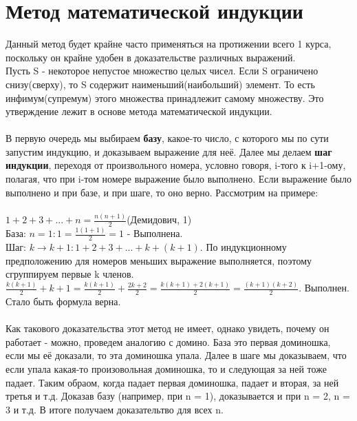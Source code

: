 \documentclass[a4paper]{article}
\begin{document}
\section{Метод математической индукции}
Данный метод будет крайне часто применяться на протижении всего 1 курса, поскольку он крайне удобен в доказательстве различных выражений.\\
Пусть S - некоторое непустое множество целых чисел. Если S ограничено снизу(сверху), то S содержит наименьший(наибольший) элемент. То есть инфимум(супремум) этого множества принадлежит самому множеству. Это утверждение лежит в основе метода математической индукции.\\\\
В первую очередь мы выбираем \textbf{базу}, какое-то число, с которого мы по сути запустим индукцию, и доказываем выражение для неё. Далее мы делаем \textbf{шаг индукции}, переходя от произвольного номера, условно говоря, i-того к i+1-ому, полагая, что при i-том номере выражение было выполнено. Если выражение было выполнено и при базе, и при шаге, то оно верно. Рассмотрим на примере:\\\\
$1 + 2 + 3 + ... + n = \frac{n(n+1)}{2}$(Демидович, 1)\\
База: $n = 1: 1 = \frac{1(1+1)}{2} = 1$ - Выполнена.\\
Шаг: $k \xrightarrow \  k + 1: 1 + 2 + 3 + ... + k + (k + 1)$. По индукционному предположению для номеров меньших выражение выполняется, поэтому сгруппируем первые k членов. $\frac{k(k+1)}{2} + k + 1 = \frac{k(k+1)}{2} + \frac{2k+2}{2} = \frac{k(k+1) + 2(k+1)}{2} = \frac{(k+1)(k+2)}{2}$. Выполнен. Стало быть формула верна.
\\\\
Как такового доказательства этот метод не имеет, однако увидеть, почему он работает - можно, проведем аналогию с домино. База это первая доминошка, если мы её доказали, то эта доминошка упала. Далее в шаге мы доказываем, что если упала какая-то произовольная доминошка, то и следующая за ней тоже падает. Таким обраом, когда падает первая доминошка, падает и вторая, за ней третья и т.д. Доказав базу (например, при n = 1), доказывается и при n = 2, n = 3 и т.д. В итоге получаем доказательтво для всех n. 
\end{document}

